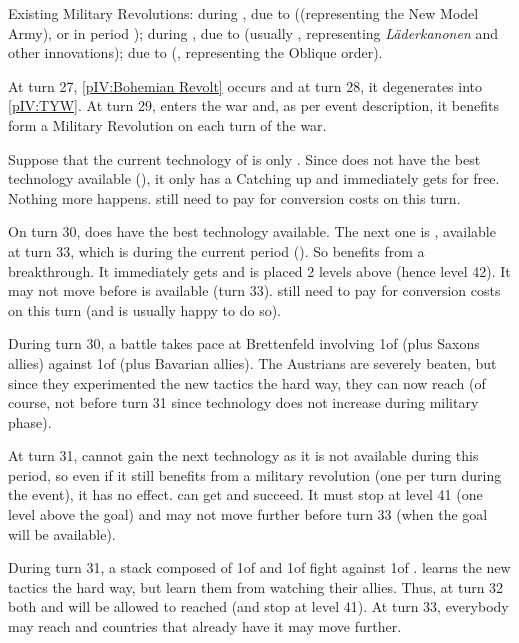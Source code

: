 \aparag Existing Military Revolutions:
\bparag during , due to 
(\TBAR (representing the New Model Army), or \TARQ in period );
\bparag during , due to  (usually
\TBAR, representing \emph{L\"{a}derkanonen} and other innovations);
\bparag due to  (\TL, representing the Oblique order).

\begin{exemple}
  At turn 27, \ref{pIV:Bohemian Revolt} occurs and at turn 28, it degenerates
  into \ref{pIV:TYW}. At turn 29, \SUE enters the war and, as per event
  description, it benefits form a Military Revolution on each turn of the war.

  Suppose that the current technology of \SUE is only \TARQ. Since \SUE does
  not have the best technology available (\TMUS), it only has a Catching up
  and immediately gets \TMUS for free. Nothing more happens. \SUE still need
  to pay for conversion costs on this turn.

  On turn 30, \SUE does have the best technology available. The next one is
  \TBAR, available at turn 33, which is during the current period
  (). So \SUE benefits from a breakthrough. It immediately gets
  \TBAR and is placed 2 levels above (hence level 42). It may not move before
  \TBAR is available (turn 33). \SUE still need to pay for conversion costs on
  this turn (and is usually happy to do so).

  During turn 30, a battle takes pace at Brettenfeld involving 1\ARMY of \SUE
  (plus Saxons allies) against 1\ARMY of \AUS (plus Bavarian allies). The
  Austrians are severely beaten, but since they experimented the new tactics
  the hard way, they can now reach \TBAR (of course, not before turn 31 since
  technology does not increase during military phase).

  At turn 31, \SUE cannot gain the next technology as it is not available
  during this period, so even if it still benefits from a military revolution
  (one per turn during the event), it has no effect. \AUS can get \TBAR and
  succeed. It must stop at level 41 (one level above the goal) and may not
  move further before turn 33 (when the goal will be available).

  During turn 31, a stack composed of 1\ARMY of \AUS and 1\ARMY of \HIS fight
  against 1\ARMY of \HOL. \HOL learns the new tactics the hard way, but \HIS
  learn them from watching their allies. Thus, at turn 32 both \HOL and \HIS
  will be allowed to reached \TBAR (and stop at level 41). At turn 33,
  everybody may reach \TBAR and countries that already have it may move
  further.
\end{exemple}



